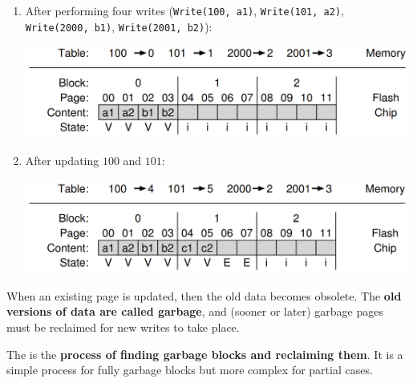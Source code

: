 \begin{examplebox}
\begin{enumerate}
        \item After performing four writes (\texttt{Write(100, a1)}, \texttt{Write(101, a2)}, \texttt{Write(2000, b1)}, \texttt{Write(2001, b2)}):
        \begin{center}
            \includegraphics[width=.8\textwidth]{img/log-structured-ftl-4.png}
        \end{center}

        \item After updating $100$ and $101$:
        \begin{center}
            \includegraphics[width=.8\textwidth]{img/log-structured-ftl-5.png}
        \end{center}
    \end{enumerate}
\end{examplebox}

\noindent
When an existing page is updated, then the old data becomes obsolete. The \textbf{old versions of data are called garbage}, and (sooner or later) garbage pages must be reclaimed for new writes to take place.

\highspace
The  is the \textbf{process of finding garbage blocks and reclaiming them}. It is a simple process for fully garbage blocks but more complex for partial cases.

